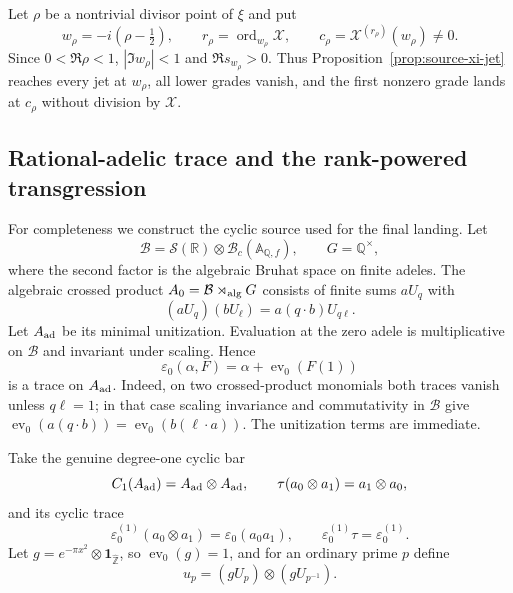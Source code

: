 \documentclass[11pt,a4paper]{amsart}
\theoremstyle{plain}
\theoremstyle{definition}
\newcommand{\RR}{\mathbb R}
\newcommand{\QQ}{\mathbb Q}
\begin{document}
Let $\rho$ be a nontrivial divisor point of $\xi$ and put
\begin{equation}\label{eq:xi-leading-jet}
 w_\rho=-i(\rho-\tfrac12),\qquad
 r_\rho=\operatorname{ord}_{w_\rho}\mathcal X,\qquad
 c_\rho=\mathcal X^{(r_\rho)}(w_\rho)\ne0.
\end{equation}
Since $0<\Re\rho<1$, $|\Im w_\rho|<1$ and $\Re s_{w_\rho}>0$.  Thus
Proposition~\ref{prop:source-xi-jet} reaches every jet at $w_\rho$, all lower grades vanish, and
the first nonzero grade lands at $c_\rho$ without division by $\mathcal X$.

\subsection{Rational-adelic trace and the rank-powered transgression}

For completeness we construct the cyclic source used for the final landing.  Let
\[
 \mathcal B=\mathcal S(\RR)\otimes
     \mathcal B_c(\mathbb A_{\QQ,f}),\qquad G=\QQ^{\times},
\]
where the second factor is the algebraic Bruhat space on finite adeles.  The algebraic crossed
product $A_0=\mathcal B\rtimes_{\rm alg}G$ consists of finite sums $aU_q$ with
\begin{equation}\label{eq:crossed-product}
                  (aU_q)(bU_\ell)=a(q\cdot b)U_{q\ell}.
\end{equation}
Let $A_{\rm ad}$ be its minimal unitization.  Evaluation at the zero adele is multiplicative on
$\mathcal B$ and invariant under scaling.  Hence
\begin{equation}\label{eq:epsilon-zero}
 \varepsilon_0(\alpha,F)=\alpha+\operatorname{ev}_0(F(1))
\end{equation}
is a trace on $A_{\rm ad}$.  Indeed, on two crossed-product monomials both traces vanish unless
$q\ell=1$; in that case scaling invariance and commutativity in $\mathcal B$ give
$\operatorname{ev}_0(a(q\cdot b))=\operatorname{ev}_0(b(\ell\cdot a))$.
The unitization terms are immediate.

Take the genuine degree-one cyclic bar
\[
 C_1(A_{\rm ad})=A_{\rm ad}\otimes A_{\rm ad},\qquad
 \tau(a_0\otimes a_1)=a_1\otimes a_0,
\]
and its cyclic trace
\begin{equation}\label{eq:cyclic-trace}
 \varepsilon_0^{(1)}(a_0\otimes a_1)
     =\varepsilon_0(a_0a_1),\qquad
 \varepsilon_0^{(1)}\tau=\varepsilon_0^{(1)}.
\end{equation}
Let $g=e^{-\pi x^2}\otimes\mathbf 1_{\widehat{\mathbb Z}}$, so
$\operatorname{ev}_0(g)=1$, and for an ordinary prime $p$ define
\begin{equation}\label{eq:prime-cycle}
                u_p=(gU_p)\otimes(gU_{p^{-1}}).
\end{equation}
\end{document}
